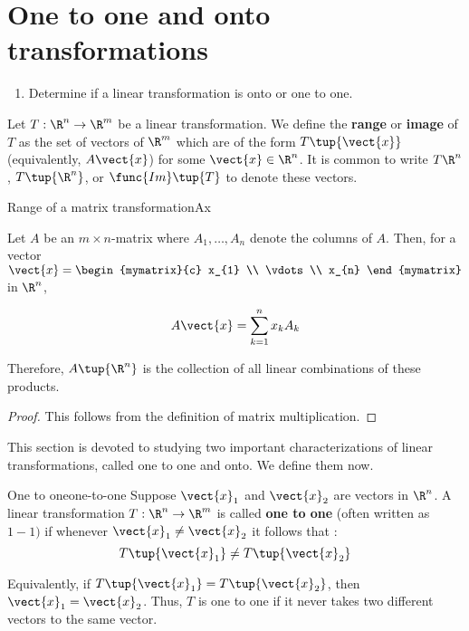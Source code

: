 \section{One to one and onto transformations}

\begin{outcome}
  \begin{enumerate}
  \item Determine if a linear transformation is onto or one to one.
  \end{enumerate}
\end{outcome}

Let $T: \R^n \to \R^m$ be a linear transformation. We define the \textbf{range} or \textbf{image} of $T$ as the set of vectors of $\R^{m}$ which are of the form
$T \tup{\vect{x}}$ (equivalently, $A\vect{x}$) for some $\vect{x}\in \R^{n}$. It is common
to write $T\R^{n}$, $T\tup{\R^{n}}$, or
$\func{Im}\tup{T} $ to denote these vectors.  

\begin{lemma}{Range of a matrix transformation}{Ax}

Let $A$ be an $m\times n$-matrix where $A_{1},\ldots, A_{n}$ denote the columns of
$A$. Then, for a vector $\vect{x}=\begin{mymatrix}{c}
x_{1} \\
\vdots \\
 x_{n}
\end{mymatrix}$ in $\R^n$,

\begin{equation*}
A\vect{x}=\sum_{k=1}^{n}x_{k}A_{k}
\end{equation*}

Therefore, $A \tup{\R^n }$ is the collection of all
linear combinations of these products.
\end{lemma}

\begin{proof}
This follows from the definition of matrix multiplication.
\end{proof}

This section is devoted to studying two important characterizations of linear transformations, called one to one and onto. We define them now. 

\begin{definition}{One to one}{one-to-one}
Suppose $\vect{x}_1$ and $\vect{x}_2$ are vectors in $\R^n$. A linear transformation $T: \R^n \to \R^m$ is called \textbf{one to one} (often written as $1-1)$ if whenever
 $\vect{x}_1 \neq \vect{x}_2$ it follows that :
\begin{equation*}
T\tup{\vect{x}_1 } \neq T \tup{\vect{x}_2}
\end{equation*}

Equivalently, if $T\tup{\vect{x}_1 } =T\tup{\vect{x}_2}$,
then $\vect{x}_1 = \vect{x}_2$. Thus,  $T$ is one to one if it never takes two different
vectors to the same vector.
\end{definition}

